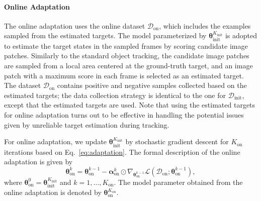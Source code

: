 \documentclass[letterpaper]{article} %
\def \datainit{\mathcal{D}_\text{init}}
\def \dataonline{\mathcal{D}_\text{on}}
\def \thetainitadapt{\boldsymbol{\theta}_\text{init}}
\def \thetaonlineadapt{\boldsymbol{\theta}_\text{on}}
\def \alphaonline{\boldsymbol{\alpha}_\text{on}}
\def \Kinit{K_\text{init}}
\def \Konline{K_\text{on}}
\begin{document}
\paragraph{Online Adaptation}
The online adaptation uses the online dataset $\dataonline$, which includes the examples sampled from the estimated targets.
The model parameterized by $\thetainitadapt^{\Kinit}$ is adopted to estimate the target states in the sampled frames by scoring candidate image patches.
Similarly to the standard object tracking, the candidate image patches are sampled from a local area centered at the ground-truth target, and an image patch with a maximum score in each frame is selected as an estimated target.
The dataset $\dataonline$ contains positive and negative samples collected based on the estimated targets; the data collection strategy is identical to the one for $\datainit$, except that the estimated targets are used.
Note that using the estimated targets for online adaptation turns out to be effective in handling the potential issues given by unreliable target estimation during tracking.

For online adaptation, we update $\thetainitadapt^{\Kinit}$ by stochastic gradient descent for $\Konline$ iterations based on Eq.~\eqref{eq:adaptation}.
The formal description of the online adaptation is given by
\begin{equation}
\thetaonlineadapt^k = \thetaonlineadapt^{k-1} - \alphaonline^k \odot \nabla_{\thetaonlineadapt^{k-1}}\mathcal{L}(\dataonline; \thetaonlineadapt^{k-1}),
\label{eq:weak_adaptation}
\end{equation}
where $\thetaonlineadapt^0 = \thetainitadapt^{\Kinit}$ and $k =1, \dots ,\Konline$.
The model parameter obtained from the online adaptation is denoted by $\thetaonlineadapt^{\Konline}$.
\end{document}
